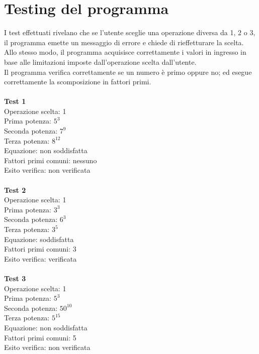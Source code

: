 \documentclass[10pt]{report}
\begin{document}
\newpage

\section{Testing del programma}

I test effettuati rivelano che se l'utente sceglie una operazione diversa da 1, 2 o 3, il programma emette un messaggio di errore e chiede di rieffetturare la scelta.\\
Allo stesso modo, il programma acquisisce correttamente i valori in ingresso in base alle limitazioni imposte dall'operazione scelta dall'utente.\\
Il programma verifica correttamente se un numero è primo oppure no; ed esegue correttamente la scomposizione in fattori primi.
\\
\\
\textbf{Test 1}\\
Operazione scelta: 1\\
Prima potenza: $5^3$\\
Seconda potenza: $7^9$\\
Terza potenza: $8^12$\\
Equazione: non soddisfatta\\
Fattori primi comuni: nessuno\\
Esito verifica: non verificata\\
\\
\textbf{Test 2}\\ 
Operazione scelta: 1\\
Prima potenza: $3^3$\\
Seconda potenza: $6^3$\\
Terza potenza: $3^5$\\
Equazione: soddisfatta\\
Fattori primi comuni: 3\\
Esito verifica: verificata\\
\\
\textbf{Test 3}\\ 
Operazione scelta: 1\\
Prima potenza: $5^3$\\
Seconda potenza: $50^10$\\
Terza potenza: $5^15$\\
Equazione: non soddisfatta\\
Fattori primi comuni: 5\\
Esito verifica: non verificata\\
\\
\\
\end{document}
